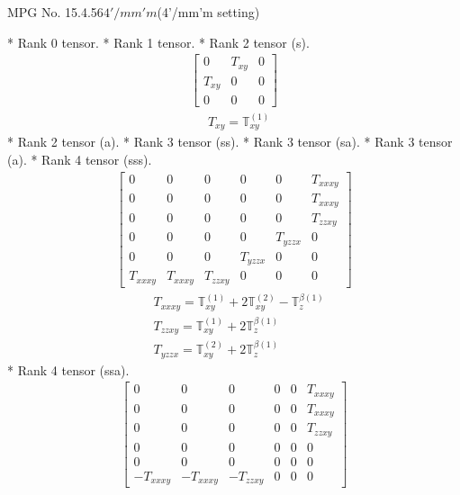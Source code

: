 \documentclass[fleqn,8pt,landscape]{jsarticle}
\begin{document}
\setcounter{MaxMatrixCols}{32}

\renewcommand{\tablename}{Table~}
\renewcommand{\figurename}{Figure~}
\begin{center}
\LARGE
MPG No. 15.4.56\quad$4'/mm'm$\quad(4'/mm'm setting)
\end{center}
* Rank 0 tensor.
* Rank 1 tensor.
* Rank 2 tensor (s).
\begin{align*}
\begin{bmatrix} 0 & T_{xy} & 0 \\ T_{xy} & 0 & 0 \\ 0 & 0 & 0 \end{bmatrix}
\end{align*}
\begin{align*}
& T_{xy} = \mathbb{T}_{xy}^{(1)}
\end{align*}
* Rank 2 tensor (a).
* Rank 3 tensor (ss).
* Rank 3 tensor (sa).
* Rank 3 tensor (a).
* Rank 4 tensor (sss).
\begin{align*}
\begin{bmatrix} 0 & 0 & 0 & 0 & 0 & T_{xxxy} \\ 0 & 0 & 0 & 0 & 0 & T_{xxxy} \\ 0 & 0 & 0 & 0 & 0 & T_{zzxy} \\ 0 & 0 & 0 & 0 & T_{yzzx} & 0 \\ 0 & 0 & 0 & T_{yzzx} & 0 & 0 \\ T_{xxxy} & T_{xxxy} & T_{zzxy} & 0 & 0 & 0 \end{bmatrix}
\end{align*}
\begin{align*}
& T_{xxxy} = \mathbb{T}_{xy}^{(1)} + 2 \mathbb{T}_{xy}^{(2)} - \mathbb{T}_{z}^{\beta(1)} \\
& T_{zzxy} = \mathbb{T}_{xy}^{(1)} + 2 \mathbb{T}_{z}^{\beta(1)} \\
& T_{yzzx} = \mathbb{T}_{xy}^{(2)} + 2 \mathbb{T}_{z}^{\beta(1)}
\end{align*}
* Rank 4 tensor (ssa).
\begin{align*}
\begin{bmatrix} 0 & 0 & 0 & 0 & 0 & T_{xxxy} \\ 0 & 0 & 0 & 0 & 0 & T_{xxxy} \\ 0 & 0 & 0 & 0 & 0 & T_{zzxy} \\ 0 & 0 & 0 & 0 & 0 & 0 \\ 0 & 0 & 0 & 0 & 0 & 0 \\ - T_{xxxy} & - T_{xxxy} & - T_{zzxy} & 0 & 0 & 0 \end{bmatrix}
\end{align*}
\end{document}
